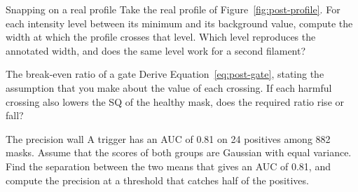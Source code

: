 \begin{exercise}{Snapping on a real profile}
Take the real profile of Figure~\ref{fig:post-profile}. For each intensity level between its minimum
and its background value, compute the width at which the profile crosses that level. Which level
reproduces the annotated width, and does the same level work for a second filament?
\end{exercise}

\begin{exercise}{The break-even ratio of a gate}
Derive Equation~\eqref{eq:post-gate}, stating the assumption that you make about the value of each
crossing. If each harmful crossing also lowers the SQ of the healthy mask, does the required ratio
rise or fall?
\end{exercise}

\begin{exercise}{The precision wall}
A trigger has an AUC of 0.81 on 24 positives among 882 masks. Assume that the scores of both groups
are Gaussian with equal variance. Find the separation between the two means that gives an AUC of
0.81, and compute the precision at a threshold that catches half of the positives.
\end{exercise}
